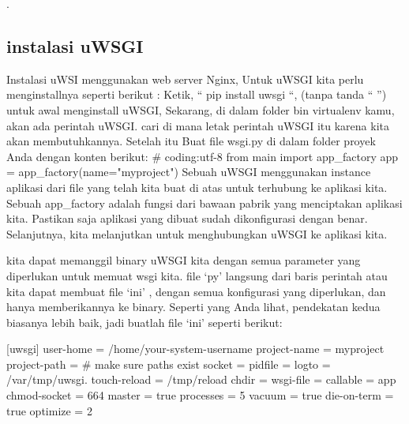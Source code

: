\cite{true150828teaplot}.

\subsection{instalasi uWSGI}
Instalasi uWSI menggunakan web server Nginx, Untuk uWSGI kita perlu menginstallnya seperti berikut :
Ketik, “ pip install uwsgi “, (tanpa tanda “ ”) untuk awal menginstall uWSGI,
Sekarang, di dalam folder bin virtualenv kamu, akan ada perintah uWSGI. cari
di mana letak perintah uWSGI itu karena kita akan membutuhkannya. Setelah itu
Buat file wsgi.py di dalam folder proyek Anda dengan konten berikut:
# coding:utf-8
from main import app_factory
app = app_factory(name="myproject")
Sebuah uWSGI menggunakan instance aplikasi dari file yang telah kita buat di atas untuk terhubung ke aplikasi kita. Sebuah app_factory adalah fungsi dari bawaan pabrik yang menciptakan aplikasi kita. Pastikan saja aplikasi yang dibuat sudah dikonfigurasi dengan benar. Selanjutnya, kita melanjutkan untuk menghubungkan uWSGI ke aplikasi kita.

kita dapat memanggil binary uWSGI kita dengan semua parameter yang diperlukan untuk memuat wsgi kita. file ‘py’ langsung dari baris perintah atau kita dapat membuat file ‘ini’ , dengan semua konfigurasi yang diperlukan, dan hanya memberikannya ke binary. Seperti yang Anda lihat, pendekatan kedua biasanya lebih baik, jadi buatlah file ‘ini’ seperti berikut:

[uwsgi]
user-home = /home/your-system-username
project-name = myproject
project-path = %
# make sure paths exist
socket = %
pidfile = %
logto = /var/tmp/uwsgi.%
touch-reload = /tmp/reload
chdir = %
wsgi-file = %
callable = app
chmod-socket = 664
master = true
processes = 5
vacuum = true
die-on-term = true
optimize = 2

